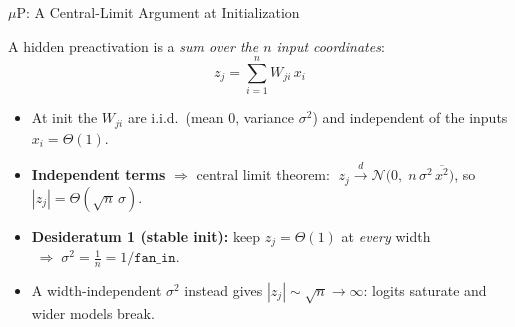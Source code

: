 \begin{frame}{$\mu$P: A Central-Limit Argument at Initialization}

  A hidden preactivation is a \emph{sum over the $n$ input coordinates}:
  \[
    z_j = \sum_{i=1}^{n} W_{ji}\, x_i
  \]

  \begin{itemize}
    \item At init the $W_{ji}$ are i.i.d.\ (mean $0$, variance $\sigma^2$) and independent of the inputs $x_i = \Theta(1)$.
    \item \textbf{Independent terms} $\Rightarrow$ central limit theorem: $\;z_j \xrightarrow{d} \mathcal{N}\!\big(0,\; n\,\sigma^2\,\overline{x^2}\big)$, so $|z_j| = \Theta(\sqrt{n}\,\sigma)$.
    \item \textbf{Desideratum 1 (stable init):} keep $z_j = \Theta(1)$ at \emph{every} width $\;\Rightarrow\; \sigma^2 = \tfrac{1}{n} = 1/\texttt{fan\_in}$.
    \item A width-independent $\sigma^2$ instead gives $|z_j| \sim \sqrt{n} \to \infty$: logits saturate and wider models break.
  \end{itemize}
\end{frame}

